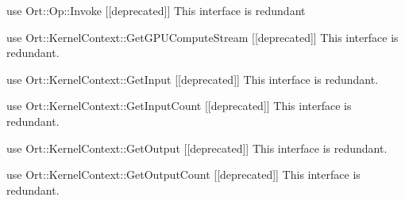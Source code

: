 \begin{DoxyRefList}
use Ort\+::\+Op\+::\+Invoke \mbox{[}\mbox{[}deprecated\mbox{]}\mbox{]} This interface is redundant  
\item[Member \doxylink{struct_ort_1_1_custom_op_api_a0bb133692d307824f5da57019963d4a2}{Ort\+::Custom\+Op\+Api\+::Kernel\+Context\+\_\+\+Get\+GPUCompute\+Stream} (const Ort\+Kernel\+Context \texorpdfstring{$\ast$}{*}context)]\label{deprecated__deprecated000019}%
%
use Ort\+::\+Kernel\+Context\+::\+Get\+GPUCompute\+Stream \mbox{[}\mbox{[}deprecated\mbox{]}\mbox{]} This interface is redundant.  
\item[Member \doxylink{struct_ort_1_1_custom_op_api_a51acc8ebdc6a1b63e80c81b3d4a2998f}{Ort\+::Custom\+Op\+Api\+::Kernel\+Context\+\_\+\+Get\+Input} (const Ort\+Kernel\+Context \texorpdfstring{$\ast$}{*}context, \+\_\+\+In\+\_\+ size\+\_\+t index)]\label{deprecated__deprecated000016}%
%
use Ort\+::\+Kernel\+Context\+::\+Get\+Input \mbox{[}\mbox{[}deprecated\mbox{]}\mbox{]} This interface is redundant.  
\item[Member \doxylink{struct_ort_1_1_custom_op_api_a17348789cfde3e1a93bf1e2af67c183e}{Ort\+::Custom\+Op\+Api\+::Kernel\+Context\+\_\+\+Get\+Input\+Count} (const Ort\+Kernel\+Context \texorpdfstring{$\ast$}{*}context)]\label{deprecated__deprecated000015}%
%
use Ort\+::\+Kernel\+Context\+::\+Get\+Input\+Count \mbox{[}\mbox{[}deprecated\mbox{]}\mbox{]} This interface is redundant.  
\item[Member \doxylink{struct_ort_1_1_custom_op_api_a348b525767f73808fa81a40864e89311}{Ort\+::Custom\+Op\+Api\+::Kernel\+Context\+\_\+\+Get\+Output} (Ort\+Kernel\+Context \texorpdfstring{$\ast$}{*}context, \+\_\+\+In\+\_\+ size\+\_\+t index, \+\_\+\+In\+\_\+ const int64\+\_\+t \texorpdfstring{$\ast$}{*}dim\+\_\+values, size\+\_\+t dim\+\_\+count)]\label{deprecated__deprecated000018}%
%
use Ort\+::\+Kernel\+Context\+::\+Get\+Output \mbox{[}\mbox{[}deprecated\mbox{]}\mbox{]} This interface is redundant.  
\item[Member \doxylink{struct_ort_1_1_custom_op_api_a015cb844d1127a400228c2756892d453}{Ort\+::Custom\+Op\+Api\+::Kernel\+Context\+\_\+\+Get\+Output\+Count} (const Ort\+Kernel\+Context \texorpdfstring{$\ast$}{*}context)]\label{deprecated__deprecated000017}%
%
use Ort\+::\+Kernel\+Context\+::\+Get\+Output\+Count \mbox{[}\mbox{[}deprecated\mbox{]}\mbox{]} This interface is redundant.  
\item[Member \doxylink{struct_ort_1_1_custom_op_api_acc9b6c6b9375ffc86703fb1909d067a3}{Ort\+::Custom\+Op\+Api\+::Kernel\+Info\+Get\+Attribute} (\+\_\+\+In\+\_\+ const Ort\+Kernel\+Info \texorpdfstring{$\ast$}{*}info, \+\_\+\+In\+\_\+ const char \texorpdfstring{$\ast$}{*}name)]\label{deprecated__deprecated000026}%

\end{DoxyRefList}
